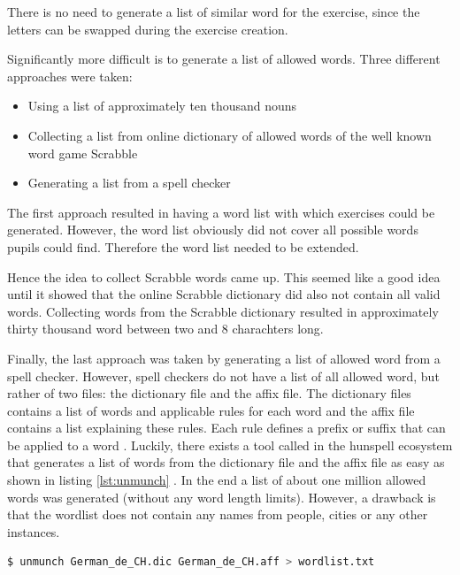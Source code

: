 There is no need to generate a list of similar word for the  exercise, since the letters can be swapped during the exercise creation.

Significantly more difficult is to generate a list of allowed words. Three different approaches were taken:

\begin{itemize}
  \item Using a list of approximately ten thousand nouns
  \item Collecting a list from online dictionary of allowed words of the well known word game Scrabble \cite{Scrabble}
  \item Generating a list from a spell checker
\end{itemize}

The first approach resulted in having a word list with which exercises could be generated. However, the word list obviously did not cover all possible words pupils could find. Therefore the word list needed to be extended.

Hence the idea to collect Scrabble words came up. This seemed like a good idea until it showed that the online Scrabble dictionary did also not contain all valid words.
Collecting words from the Scrabble dictionary resulted in approximately thirty thousand word between two and 8 charachters long.

Finally, the last approach was taken by generating a list of allowed word from a spell checker. However, spell checkers do not have a list of all allowed word, but rather of two files: the dictionary file and the affix file. The dictionary files contains a list of words and applicable rules for each word and the affix file contains a list explaining these rules. Each rule defines a prefix or suffix that can be applied to a word \cite{Hunspell}. 
Luckily, there exists a tool called  in the hunspell ecosystem that generates a list of words from the dictionary file and the affix file as easy as shown in listing \ref{lst:unmunch} \cite{HunspellGithub}.
In the end a list of about one million allowed words was generated (without any word length limits). However, a drawback is that the wordlist does not contain any names from people, cities or any other instances. 

\begin{lstlisting}[language=Bash,caption={Bash command to unmunch a dictionary file and a affix file to a list of words},label={lst:unmunch}]
$ unmunch German_de_CH.dic German_de_CH.aff > wordlist.txt
\end{lstlisting}

